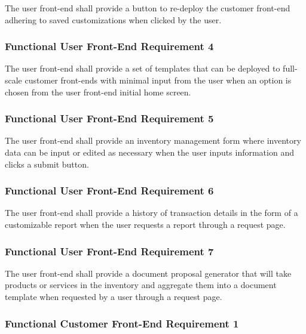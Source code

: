 \documentclass{article}
\begin{document}
The user front-end shall provide a button to re-deploy the customer front-end
adhering to saved customizations when clicked by the user.

\subsubsection{Functional User Front-End Requirement 4}
\label{func-user-front-end-4}

The user front-end shall provide a set of templates that can be deployed to
full-scale customer front-ends with minimal input from the user when an option
is chosen from the user front-end initial home screen.

\subsubsection{Functional User Front-End Requirement 5}
\label{func-user-front-end-5}

The user front-end shall provide an inventory management form where inventory
data can be input or edited as necessary when the user inputs information and
clicks a submit button.

\subsubsection{Functional User Front-End Requirement 6}
\label{func-user-front-end-6}

The user front-end shall provide a history of transaction details in the form
of a customizable report when the user requests a report through a request page.

\subsubsection{Functional User Front-End Requirement 7}
\label{func-user-front-end-7}

The user front-end shall provide a document proposal generator that will take
products or services in the inventory and aggregate them into a document
template when requested by a user through a request page.



\subsubsection{Functional Customer Front-End Requirement 1}
\label{func-cust-front-end-1}
\end{document}
